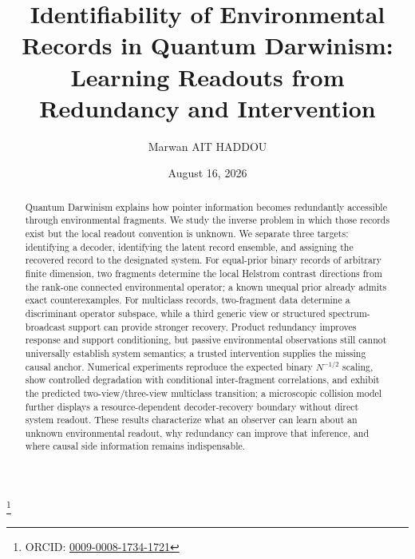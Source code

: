 

\title{\texorpdfstring{Identifiability of Environmental Records in Quantum Darwinism:\\Learning Readouts from Redundancy and Intervention}{Identifiability of Environmental Records in Quantum Darwinism: Learning Readouts from Redundancy and Intervention}}

\author{Marwan AIT HADDOU}
\thanks{ORCID: \href{https://orcid.org/0009-0008-1734-1721}{0009-0008-1734-1721}}

\date{August 16, 2026}

\begin{abstract}
Quantum Darwinism explains how pointer information becomes redundantly accessible through environmental fragments. We study the inverse problem in which those records exist but the local readout convention is unknown. We separate three targets: identifying a decoder, identifying the latent record ensemble, and assigning the recovered record to the designated system. For equal-prior binary records of arbitrary finite dimension, two fragments determine the local Helstrom contrast directions from the rank-one connected environmental operator; a known unequal prior already admits exact counterexamples. For multiclass records, two-fragment data determine a discriminant operator subspace, while a third generic view or structured spectrum-broadcast support can provide stronger recovery. Product redundancy improves response and support conditioning, but passive environmental observations still cannot universally establish system semantics; a trusted intervention supplies the missing causal anchor. Numerical experiments reproduce the expected binary $N^{-1/2}$ scaling, show controlled degradation with conditional inter-fragment correlations, and exhibit the predicted two-view/three-view multiclass transition; a microscopic collision model further displays a resource-dependent decoder-recovery boundary without direct system readout. These results characterize what an observer can learn about an unknown environmental readout, why redundancy can improve that inference, and where causal side information remains indispensable.
\end{abstract}

\maketitle

